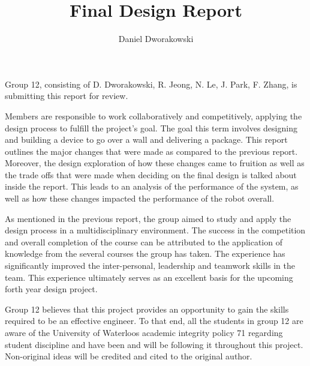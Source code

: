 \documentclass[ece]{uw-wkrpt}
\begin{document}

\title{Final Design Report}
\author{Daniel Dworakowski}
\address{University of Waterloo,\\*
        Waterloo, ON\ \ N2L 3G1}
\employeraddress{}
\maketitle

\frontmatter

% 
\begin{letter}
Group 12, consisting of D. Dworakowski, R. Jeong, N. Le, J. Park, F. Zhang, is submitting this report for review.

Members are responsible to work collaboratively and competitively, applying the design process to fulfill the project’s goal. The goal this term involves designing and building a device to go over a wall and delivering a package. This report outlines the major changes that were made as compared to the previous report. Moreover, the design exploration of how these changes came to fruition as well as the trade offs that were made when deciding on the final design is talked about inside the report. This leads to an analysis of the performance of the system, as well as how these changes impacted the performance of the robot overall.

As mentioned in the previous report, the group aimed to study and apply the design process in a multidisciplinary environment. The success in the competition and overall completion of the course can be attributed to the application of knowledge from the several courses the group has taken. The experience has significantly improved the inter-personal, leadership and teamwork skills in the team. This experience ultimately serves as an excellent basis for the upcoming forth year design project. 

Group 12 believes that this project provides an opportunity to gain the skills required to be an effective engineer. To that end, all the students in group 12 are aware of the University of Waterloo\textsc{}s academic integrity policy 71 regarding \textsc{}student discipline\textsc{} and have been and will be following it throughout this project. Non-original ideas will be credited and cited to the original author.

\end{letter}
% 
\end{document}
